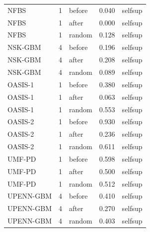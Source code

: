 \begin{tabular}{lrlrl}
NFBS & 1 & before & 0.040 & selfsup \\
NFBS & 1 & after & 0.000 & selfsup \\
NFBS & 1 & random & 0.128 & selfsup \\
NSK-GBM & 4 & before & 0.196 & selfsup \\
NSK-GBM & 4 & after & 0.208 & selfsup \\
NSK-GBM & 4 & random & 0.089 & selfsup \\
OASIS-1 & 1 & before & 0.380 & selfsup \\
OASIS-1 & 1 & after & 0.063 & selfsup \\
OASIS-1 & 1 & random & 0.553 & selfsup \\
OASIS-2 & 1 & before & 0.930 & selfsup \\
OASIS-2 & 1 & after & 0.236 & selfsup \\
OASIS-2 & 1 & random & 0.611 & selfsup \\
UMF-PD & 1 & before & 0.598 & selfsup \\
UMF-PD & 1 & after & 0.500 & selfsup \\
UMF-PD & 1 & random & 0.512 & selfsup \\
UPENN-GBM & 4 & before & 0.410 & selfsup \\
UPENN-GBM & 4 & after & 0.270 & selfsup \\
UPENN-GBM & 4 & random & 0.403 & selfsup \\
\bottomrule
\end{tabular}

